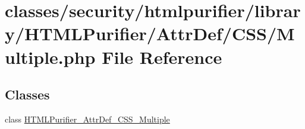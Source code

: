 \hypertarget{Multiple_8php}{\section{classes/security/htmlpurifier/library/\+H\+T\+M\+L\+Purifier/\+Attr\+Def/\+C\+S\+S/\+Multiple.php File Reference}
\label{Multiple_8php}
}
\subsection*{Classes}
\begin{DoxyCompactItemize}
\item 
class \hyperlink{classHTMLPurifier__AttrDef__CSS__Multiple}{H\+T\+M\+L\+Purifier\+\_\+\+Attr\+Def\+\_\+\+C\+S\+S\+\_\+\+Multiple}
\end{DoxyCompactItemize}
